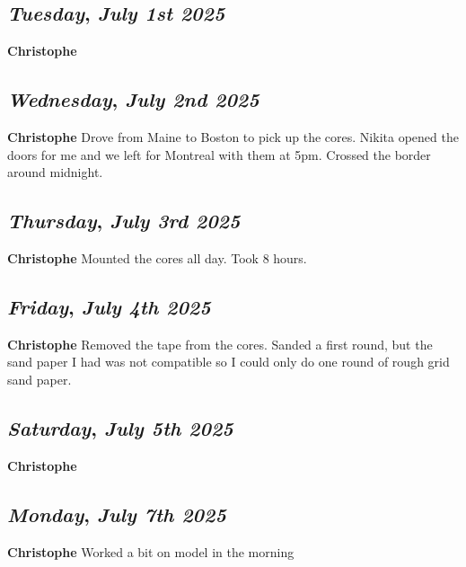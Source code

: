 \begin{center}
\section*{\month}
\end{center}

\def\day{\textit{July 1st 2025}}
\def\weekday{\textit{Tuesday}}
\subsection*{\weekday, \day}
\textbf {Christophe}

\def\day{\textit{July 2nd 2025}}
\def\weekday{\textit{Wednesday}}
\subsection*{\weekday, \day}
\textbf {Christophe}
Drove from Maine to Boston to pick up the cores. Nikita opened the doors for me and we left for Montreal with them at 5pm. Crossed the border around midnight.

\def\day{\textit{July 3rd 2025}}
\def\weekday{\textit{Thursday}}
\subsection*{\weekday, \day}
\textbf {Christophe}
Mounted the cores all day. Took 8 hours.

\def\day{\textit{July 4th 2025}}
\def\weekday{\textit{Friday}}
\subsection*{\weekday, \day}
\textbf {Christophe}
Removed the tape from the cores. Sanded a first round, but the sand paper I had was not compatible so I could only do one round of rough grid sand paper.
\def\day{\textit{July 5th 2025}}
\def\weekday{\textit{Saturday}}
\subsection*{\weekday, \day}
\textbf {Christophe}

\def\day{\textit{July 7th 2025}}
\def\weekday{\textit{Monday}}
\subsection*{\weekday, \day}
\textbf {Christophe}
Worked a bit on model in the morning 

\def\day{\textit{July 8th 2025}}
\def\weekday{\textit{Tuesday}}
